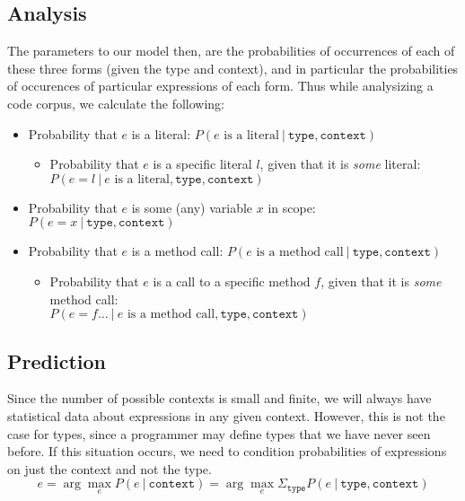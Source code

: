\documentclass{article} %
\begin{document}
\subsection*{Analysis}
The parameters to our model then, are the probabilities of occurrences of each of these three forms (given the type and context), and in particular the probabilities of occurences of particular expressions of each form. Thus while analysizing a code corpus, we calculate the following:
\begin{itemize}
  \item Probability that $e$ is a literal: $P(e \text{ is a literal} ~|~  \texttt{type} , \texttt{context} ) $
    \begin{itemize}
      \item Probability that $e$ is a specific literal $l$, given that it is \emph{some} literal: \\$P(e = l ~|~ e \text{ is a literal},  \texttt{type} , \texttt{context} )$
    \end{itemize}
  \item Probability that $e$ is some (any) variable $x$ in scope: $P(e = x ~|~ \texttt{type} , \texttt{context})$
  \item Probability that $e$ is a method call: $P(e \text{ is a method call} ~|~  \texttt{type} , \texttt{context} ) $
    \begin{itemize}
      \item Probability that $e$ is a call to a specific method $f$, given that it is \emph{some} method call: \\$P(e = f \ldots ~|~ e \text{ is a method call},  \texttt{type} , \texttt{context} )$
    \end{itemize}
\end{itemize}

\subsection*{Prediction}

Since the number of possible contexts is small and finite, we will always have statistical data about expressions in any given context. However, this is not the case for types, since a programmer may define types that we have never seen before. If this situation occurs, we need to condition probabilities of expressions on just the context and not the type. 
$$ e = \arg\max_e P(e ~|~ \texttt{context} ) = \arg\max_e \Sigma_{\texttt{type}} P(e ~|~ \texttt{type} , \texttt{context} ) $$
\end{document}
